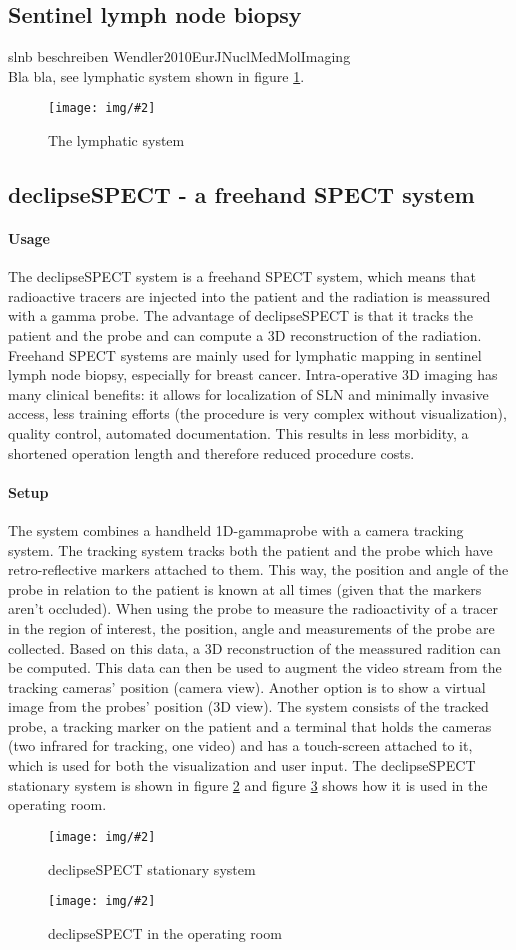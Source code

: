 \documentclass{scrartcl}
\newcommand{\red}[1]{{\color{red} #1}}
\newcommand{\graphic}[3][width=\linewidth] %
{
  \begin{figure}[h!t]
    \centering
    \texttt{[image: img/\#2]}
    \caption{#3}
    \label{fig:#2}
  \end{figure}
}
\newcommand{\refFigure}[1]{figure \ref{fig:#1}}
\begin{document}
\subsection{Sentinel lymph node biopsy}
\red{slnb beschreiben Wendler2010EurJNuclMedMolImaging}\\
Bla bla, see lymphatic system shown in \refFigure{lymphatic-system}.
\graphic[scale=.7]{lymphatic-system}{The lymphatic system}


\subsection{declipseSPECT - a freehand SPECT system}
\paragraph*{Usage}
The declipseSPECT system is a freehand SPECT system, which means that radioactive tracers are injected into the patient and the radiation is meassured with a gamma probe. The advantage of declipseSPECT is that it tracks the patient and the probe and can compute a 3D reconstruction of the radiation.
Freehand SPECT systems are mainly used for lymphatic mapping in sentinel lymph node biopsy, especially for breast cancer. Intra-operative 3D imaging has many clinical benefits: it allows for localization of SLN and minimally invasive access, less training efforts (the procedure is very complex without visualization), quality control, automated documentation. This results in less morbidity, a shortened operation length and therefore reduced procedure costs.
\paragraph*{Setup}
The system combines a handheld 1D-gammaprobe with a camera tracking system. The tracking system tracks both the patient and the probe which have retro-reflective markers attached to them. This way, the position and angle of the probe in relation to the patient is known at all times (given that the markers aren't occluded). When using the probe to measure the radioactivity of a tracer in the region of interest, the position, angle and measurements of the probe are collected. Based on this data, a 3D reconstruction of the meassured radition can be computed.
This data can then be used to augment the video stream from the tracking cameras' position (camera view). Another option is to show a virtual image from the probes' position (3D view).
The system consists of the tracked probe, a tracking marker on the patient and a terminal that holds the cameras (two infrared for tracking, one video) and has a touch-screen attached to it, which is used for both the visualization and user input. The declipseSPECT stationary system is shown in \refFigure{declipseSPECT} and \refFigure{declipseSPECT-OR} shows how it is used in the operating room.
\graphic[scale=.7]{declipseSPECT}{declipseSPECT stationary system}
\graphic[scale=.7]{declipseSPECT-OR}{declipseSPECT in the operating room}
\end{document}

